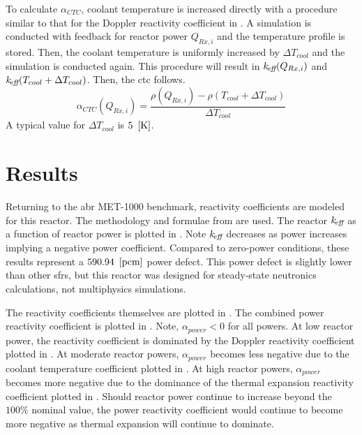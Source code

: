     To calculate $\alpha_{CTC}$, coolant temperature is increased directly with
    a procedure similar to that for the Doppler reactivity coefficient in
    . A simulation is
    conducted with feedback for reactor power $Q_{Rx,i}$ and the temperature
    profile is stored. Then, the coolant temperature is uniformly increased by
    $\Delta T_{cool}$ and the simulation is conducted again. This procedure will
    result in $k_{\!\mbox{\scriptsize \em eff}}(Q_{Rx,i})$ and ${k_{\!\mbox{\scriptsize \em eff}}(T_{cool} + \Delta T_{cool})}$. Then,
    the \gls{ctc} follows.
    \begin{equation}
      \label{eq:coolant_temperature_reactivity_coefficient}
      \alpha_{CTC}(Q_{Rx,i}) = \frac{\rho(Q_{Rx,i}) - \rho(T_{cool} + 
        \Delta T_{cool})} {\Delta T_{cool}}
    \end{equation}
    A typical value for $\Delta T_{cool}$ is $5~\left[\text{{K}}\right]$.

\section{Results}
\label{sec:results}
  Returning to the \gls{abr} MET-1000 benchmark, reactivity coefficients are
  modeled for this reactor. The methodology and formulae from
   are used. The reactor $k_{\!\mbox{\scriptsize \em eff}}$ as a function
  of reactor power is plotted in . Note $k_{\!\mbox{\scriptsize \em eff}}$ decreases
  as power increases implying a negative power coefficient. Compared to
  zero-power conditions, these results represent a $590.94~\left[\text{{pcm}}\right]$ power
  defect. This power defect is slightly lower than other \glspl{sfr}, but this
  reactor was designed for steady-state neutronics calculations, not
  multiphysics simulations.
  
  The reactivity coefficients themselves are plotted in
  . The combined power reactivity
  coefficient is plotted in . Note,
  $\alpha_{power} < 0$ for all powers. At low reactor power, the reactivity
  coefficient is dominated by the Doppler reactivity coefficient plotted in
  . At moderate reactor powers,
  $\alpha_{power}$ becomes less negative due to the coolant temperature
  coefficient plotted in .
  At high reactor powers, $\alpha_{power}$ becomes more negative due to the
  dominance of the thermal expansion reactivity coefficient plotted in
  . Should reactor power
  continue to increase beyond the $100\%$ nominal value, the power reactivity
  coefficient would continue to become more negative as thermal expansion will
  continue to dominate.

